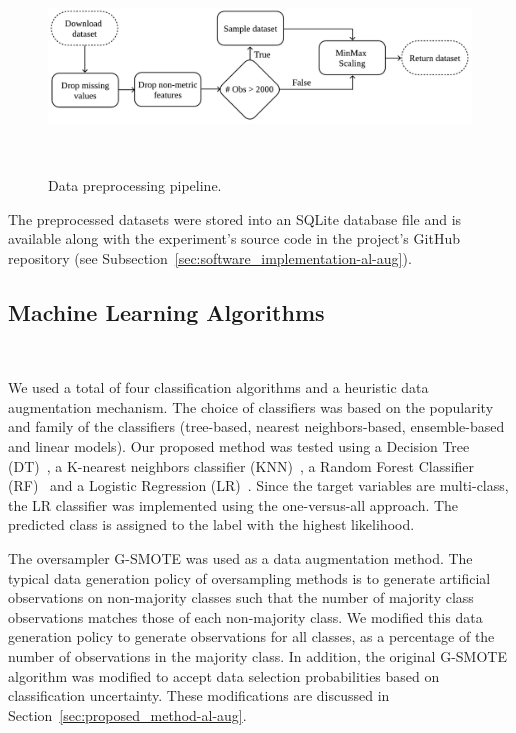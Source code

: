 \begin{figure}
	\centering
	\includegraphics[width=1\linewidth]{data_preprocessing}
    \caption{%
        Data preprocessing pipeline.
    }~\label{fig:data_preprocessing}
\end{figure}

The preprocessed datasets were stored into an SQLite database file and is
available along with the experiment's source code in the project's GitHub
repository (see Subsection~\ref{sec:software_implementation-al-aug}).
 
\subsection{Machine Learning Algorithms}~\label{sec:machine_learning_algorithms-al-aug}

We used a total of four classification algorithms and a heuristic data
augmentation mechanism. The choice of classifiers was based on the popularity
and family of the classifiers (tree-based, nearest neighbors-based,
ensemble-based and linear models). Our proposed method was tested using a
Decision Tree (DT)~\cite{Wu1975}, a K-nearest neighbors classifier
(KNN)~\cite{Cover1967}, a Random Forest Classifier (RF)~\cite{Ho1995} and a
Logistic Regression (LR)~\cite{Nelder1972}. Since the target variables are
multi-class, the LR classifier was implemented using the one-versus-all
approach. The predicted class is assigned to the label with the highest
likelihood.
 
The oversampler G-SMOTE was used as a data augmentation method. The typical
data generation policy of oversampling methods is to generate artificial
observations on non-majority classes such that the number of majority class
observations matches those of each non-majority class. We modified this data
generation policy to generate observations for all classes, as a percentage of
the number of observations in the majority class. In addition, the original
G-SMOTE algorithm was modified to accept data selection probabilities based on
classification uncertainty. These modifications are discussed in
Section~\ref{sec:proposed_method-al-aug}.

